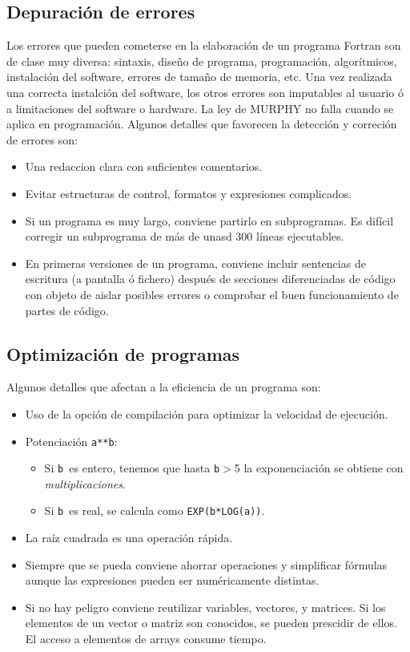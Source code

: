 \subsection{Depuración de errores}

Los errores que pueden cometerse en la elaboración de un programa Fortran son de clase muy diversa: sintaxis, diseño de programa, programación, algorítmicos, instalación del software, errores de tamaño de memoria, etc. Una vez realizada una correcta instalción del software, los otros errores son imputables al usuario ó a limitaciones del software o hardware. La ley de MURPHY no falla cuando se aplica en programación. Algunos detalles que favorecen la detección y correción de errores son:

\begin{itemize}
	\item Una redaccion clara con suficientes comentarios.
	\item Evitar estructuras de control, formatos y expresiones complicados.
	\item Si un programa es muy largo, conviene partirlo en subprogramas. Es difícil corregir un subprograma de más de unasd 300 líneas ejecutables.
	\item En primeras versiones de un programa, conviene incluir sentencias de escritura (a pantalla ó fichero) después de secciones diferenciadas de código con objeto de aislar posibles errores o comprobar el buen funcionamiento de partes de código.
\end{itemize}
 

\subsection{Optimización de programas}

Algunos detalles que afectan a la eficiencia de un programa son:

\begin{itemize}
	\item Uso de la opción de compilación para optimizar la velocidad de ejecución.
	\item Potenciación {\tt a**b}:
	      \begin{itemize}
		      \item Si {\tt b }es entero, tenemos que hasta {\tt b}$>$5 la exponenciación se obtiene con {\it multiplicaciones}.
		      \item Si {\tt b }es real, se calcula como {\tt EXP(b*LOG(a))}.
	      \end{itemize}
	\item La raíz cuadrada es una operación rápida.
	\item Siempre que se pueda conviene ahorrar operaciones y simplificar fórmulas aunque las expresiones pueden ser numéricamente distintas.
	\item Si no hay peligro conviene reutilizar variables, vectores, y matrices. Si los elementos de un vector o matriz son conocidos, se pueden prescidir de ellos. El acceso a elementos de arrays consume tiempo.
\end{itemize}
